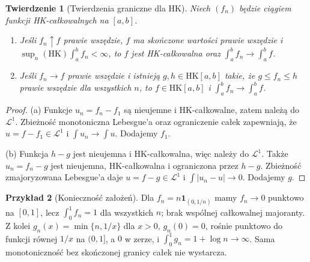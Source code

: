 \documentclass[11pt,a4paper]{article}
\numberwithin{equation}{section}
\theoremstyle{plain}
\newtheorem{twierdzenie}{Twierdzenie}[section]
\theoremstyle{definition}
\newtheorem{przyklad}[twierdzenie]{Przykład}
\theoremstyle{remark}
\newcommand{\ind}[1]{\mathbf 1_{#1}}
\newcommand{\HK}{\mathrm{HK}}
\begin{document}
\begin{twierdzenie}[Twierdzenia graniczne dla HK]
Niech $(f_n)$ będzie ciągiem funkcji HK-całkowalnych na $[a,b]$.
\begin{enumerate}[label=(\alph*)]
\item Jeśli $f_n\uparrow f$ prawie wszędzie, $f$ ma skończone wartości prawie wszędzie i $\sup_n(\HK)\int_a^b f_n<\infty$, to $f$ jest HK-całkowalna oraz $\int_a^b f_n\to\int_a^b f$.
\item Jeśli $f_n\to f$ prawie wszędzie i istnieją $g,h\in\HK[a,b]$ takie, że $g\le f_n\le h$ prawie wszędzie dla wszystkich $n$, to $f\in\HK[a,b]$ i $\int_a^b f_n\to\int_a^b f$.
\end{enumerate}
\end{twierdzenie}
\begin{proof}
(a) Funkcje $u_n=f_n-f_1$ są nieujemne i HK-całkowalne, zatem należą do $\mathcal L^1$. Zbieżność monotoniczna Lebesgue'a oraz ograniczenie całek zapewniają, że $u=f-f_1\in\mathcal L^1$ i $\int u_n\to\int u$. Dodajemy $f_1$.

(b) Funkcja $h-g$ jest nieujemna i HK-całkowalna, więc należy do $\mathcal L^1$. Także $u_n=f_n-g$ jest nieujemna, HK-całkowalna i ograniczona przez $h-g$. Zbieżność zmajoryzowana Lebesgue'a daje $u=f-g\in\mathcal L^1$ i $\int|u_n-u|\to0$. Dodajemy $g$.
\end{proof}
\begin{przyklad}[Konieczność założeń]
Dla $f_n=n\ind{(0,1/n)}$ mamy $f_n\to0$ punktowo na $[0,1]$, lecz $\int_0^1f_n=1$ dla wszystkich $n$; brak wspólnej całkowalnej majoranty. Z kolei $g_n(x)=\min\{n,1/x\}$ dla $x>0$, $g_n(0)=0$, rośnie punktowo do funkcji równej $1/x$ na $(0,1]$, a $0$ w zerze, i $\int_0^1g_n=1+\log n\to\infty$. Sama monotoniczność bez skończonej granicy całek nie wystarcza.
\end{przyklad}
\end{document}
